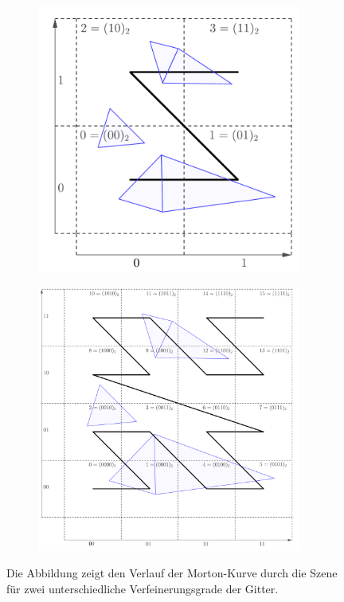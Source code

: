 \documentclass[crop=false]{standalone}
\begin{document}
      \begin{figure}[h]
        \center
        \begin{subfigure}[c]{0.49\textwidth}
          \center
          \includegraphics[width=0.95\textwidth]{images/morton_curve_1.pdf}
        \end{subfigure}
        \begin{subfigure}[c]{0.478\textwidth}
          \center
          \includegraphics[width=0.95\textwidth]{images/morton_curve_2.pdf}
        \end{subfigure}
        \caption{%
          Die Abbildung zeigt den Verlauf der Morton-Kurve durch die Szene für zwei unterschiedliche Verfeinerungsgrade der Gitter.
        }
        \label{fig:morton-curve-scheme}
      \end{figure}
\end{document}
